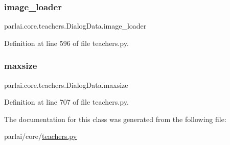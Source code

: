 \subsubsection{\texorpdfstring{image\+\_\+loader}{image\_loader}}
{\footnotesize\ttfamily parlai.\+core.\+teachers.\+Dialog\+Data.\+image\+\_\+loader}



Definition at line 596 of file teachers.\+py.

\mbox{\label{classparlai_1_1core_1_1teachers_1_1DialogData_a9c25f1914274bbc5b6aeae335e98957a}} 
\subsubsection{\texorpdfstring{maxsize}{maxsize}}
{\footnotesize\ttfamily parlai.\+core.\+teachers.\+Dialog\+Data.\+maxsize\hspace{0.3cm}{\ttfamily [static]}}



Definition at line 707 of file teachers.\+py.



The documentation for this class was generated from the following file\+:\begin{DoxyCompactItemize}
\item 
parlai/core/\hyperlink{teachers_8py}{teachers.\+py}\end{DoxyCompactItemize}
